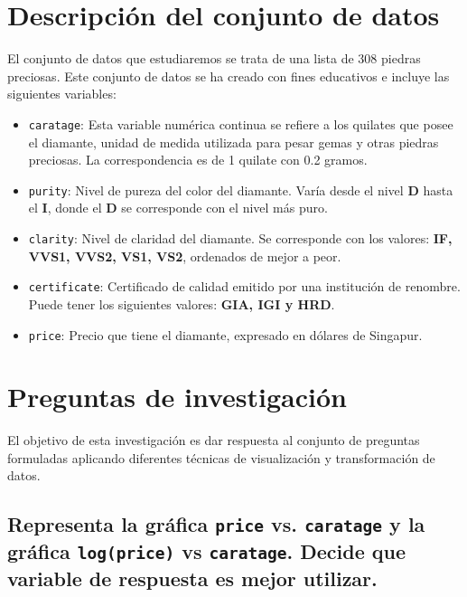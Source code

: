 \documentclass[a4paper, 9pt]{article}
\begin{document}



\section{Descripción del conjunto de datos}
\label{sec:descripcion-datos}
\noindent

El conjunto de datos que estudiaremos se trata de una lista de 308 piedras preciosas. Este conjunto de datos se ha creado con fines educativos e incluye las siguientes variables:

\begin{itemize}
    \item \texttt{caratage}: Esta variable numérica continua se refiere a los quilates que posee el diamante, unidad de medida utilizada para pesar gemas y otras piedras preciosas. La correspondencia es de 1 quilate con 0.2 gramos.
    \item \texttt{purity}: Nivel de pureza del color del diamante. Varía desde el nivel \textbf{D} hasta el \textbf{I}, donde el \textbf{D} se corresponde con el nivel más puro.
    \item \texttt{clarity}: Nivel de claridad del diamante. Se corresponde con los valores: \textbf{IF, VVS1, VVS2, VS1, VS2}, ordenados de mejor a peor.
    \item \texttt{certificate}: Certificado de calidad emitido por una institución de renombre. Puede tener los siguientes valores: \textbf{GIA, IGI y HRD}.
    \item \texttt{price}: Precio que tiene el diamante, expresado en dólares de Singapur.
\end{itemize}

\section{Preguntas de investigación}
\noindent
El objetivo de esta investigación es dar respuesta al conjunto de preguntas formuladas aplicando diferentes técnicas de visualización y transformación de datos.

\subsection{Representa la gráfica \texttt{price} vs. \texttt{caratage} y la gráfica \texttt{log(price)} vs \texttt{caratage}. Decide que variable de respuesta es mejor utilizar.}
\label{subsec:question-1}
\end{document}
